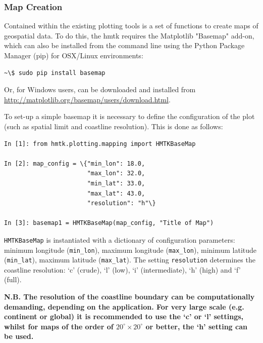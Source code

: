 \subsubsection{Map Creation}

Contained within the existing plotting tools is a set of functions to create maps of geospatial data. To do this, the hmtk requires the Matplotlib "Basemap" add-on, which can also be installed from the command line using the Python Package Manager (pip) for OSX/Linux environments:

\begin{Verbatim}[frame=single, commandchars=\\\{\}, fontsize=\scriptsize]
~\$ sudo pip install basemap
\end{Verbatim}   

Or, for Windows users, can be downloaded and installed from\\ \href{http://matplotlib.org/basemap/users/download.html}{http://matplotlib.org/basemap/users/download.html}. 

To set-up a simple basemap it is necessary to define the configuration of the plot (such as spatial limit and coastline resolution). This is done as follows:

\begin{Verbatim}[frame=single, commandchars=\\\{\}, fontsize=\scriptsize]
In [1]: from hmtk.plotting.mapping import HMTKBaseMap

In [2]: map_config = \{"min_lon": 18.0,
                       "max_lon": 32.0,
                       "min_lat": 33.0,
                       "max_lat": 43.0,
                       "resolution": "h"\}

In [3]: basemap1 = HMTKBaseMap(map_config, "Title of Map")
\end{Verbatim}  

\verb=HMTKBaseMap= is instantiated with a dictionary of configuration parameters: minimum longitude (\verb=min_lon=), maximum longitude (\verb=max_lon=), minimum latitude (\verb=min_lat=), maximum latitude (\verb=max_lat=). The setting \verb=resolution= determines the coastline resolution: `c' (crude), `l' (low), `i' (intermediate), `h' (high) and `f' (full).

\textbf{N.B. The resolution of the coastline boundary can be computationally demanding, depending on the application. For very large scale (e.g. continent or global) it is recommended to use the `c' or `l' settings, whilst for maps of the order of $20^{\circ} \times 20^{\circ}$ or better, the `h' setting can be used.} 

